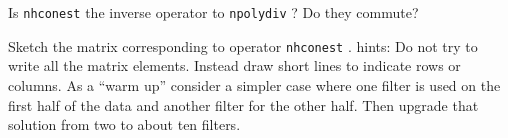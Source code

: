 \begin{exer}
\item
Is 
\texttt{nhconest} 
the inverse operator to
\texttt{npolydiv} ?
Do they commute?
\item
Sketch the matrix corresponding to operator
\texttt{nhconest} .  {\sc hints:}
Do not try to write all the matrix elements.
Instead draw short lines to indicate rows or columns.
As a ``warm up'' consider a simpler case where one filter
is used on the first half of the data and another filter
for the other half.
Then upgrade that solution from two to about ten filters.
\end{exer}


%
%




                                                                        
